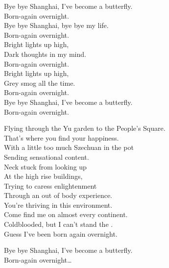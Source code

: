 
Bye bye Shanghai, I've become a butterfly. \\
Born-again overnight. \\
Bye bye Shanghai, bye bye my life. \\
Born-again overnight. \\

Bright lights up high, \\
Dark thoughts in my mind. \\
Born-again overnight. \\

Bright lights up high, \\
Grey smog all the time. \\
Born-again overnight. \\

Bye bye Shanghai, I've become a butterfly. \\
Born-again overnight. \\


Flying through the Yu garden to the People's Square. \\
That's where you find your happiness. \\
With a little too much Szechuan in the pot \\
Sending sensational content. \\

Neck stuck from looking up \\
At the high rise buildings, \\
Trying to caress enlightenment \\
Through an out of body experience. \\

You're thriving in this environment. \\
Come find me on almost every continent. \\
Coldblooded, but I can't stand the . \\
Guess I've been born again overnight. \\


Bye bye Shanghai, I've become a butterfly. \\
Born-again overnight… \\


